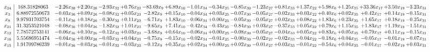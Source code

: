 \documentclass[9pt]{article}
\begin{document}
 \[\begin{array}{c| c c@{\hskip 2pt} c@{\hskip 2pt} c@{\hskip 2pt} c@{\hskip 2pt} c@{\hskip 2pt} c@{\hskip 2pt} c@{\hskip 2pt} c@{\hskip 2pt} c@{\hskip 2pt} c@{\hskip 2pt} c@{\hskip 2pt} c@{\hskip 2pt} c@{\hskip 2pt} c@{\hskip 2pt} c@{\hskip 2pt} c@{\hskip 2pt} c@{\hskip 2pt} }
 x_{24}   &  168.31828063 & -2.26 x_{36} & +  2.20 x_{26} & -2.93 x_{32} & +  0.76 x_{23} & -83.69 x_{9} & +  6.89 x_{10} & -1.01 x_{34} & -0.34 x_{25} & -0.85 x_{30} & -1.23 x_{27} & +  0.81 x_{33} & +  1.37 x_{22} & +  5.98 x_{6} & +  1.25 x_{35} & + 33.36 x_{17} & +  3.50 x_{19} & -3.23 x_{31}\\
 x_{3}   &  6.88972550673 & -0.03 x_{36} & +  0.09 x_{26} & -0.08 x_{32} & +  0.05 x_{23} & -2.82 x_{9} & +  0.15 x_{10} & -0.04 x_{34} & +  0.03 x_{25} & -0.07 x_{30} & -0.05 x_{27} & -0.02 x_{33} & +  0.03 x_{22} & +  0.40 x_{6} & +  0.02 x_{35} & +  0.42 x_{17} & +  0.14 x_{19} & -0.15 x_{31}\\
 x_{8}   &  9.97931703754 & -0.11 x_{36} & +  0.18 x_{26} & -0.30 x_{32} & +  0.11 x_{23} & -6.71 x_{9} & +  1.83 x_{10} & -0.06 x_{34} & +  0.00 x_{25} & -0.05 x_{30} & -0.05 x_{27} & +  0.02 x_{33} & +  0.08 x_{22} & +  1.83 x_{6} & +  0.23 x_{35} & +  1.65 x_{17} & +  0.18 x_{19} & -0.25 x_{31}\\
 x_{21}   &  31.3253521048 & -0.08 x_{36} & +  0.04 x_{26} & -1.82 x_{32} & +  1.01 x_{23} & -9.65 x_{9} & +  7.41 x_{10} & -0.42 x_{34} & -0.43 x_{25} & -0.84 x_{30} & +  0.03 x_{27} & -0.37 x_{33} & +  0.05 x_{22} & +  0.79 x_{6} & +  1.15 x_{35} & +  1.83 x_{17} & +  1.19 x_{19} & -1.51 x_{31}\\
 x_{12}   &  7.78572753141 & -0.06 x_{36} & +  0.10 x_{26} & -0.12 x_{32} & +  0.03 x_{23} & -3.68 x_{9} & +  0.64 x_{10} & -0.06 x_{34} & +  0.00 x_{25} & -0.08 x_{30} & -0.05 x_{27} & -0.04 x_{33} & +  0.05 x_{22} & +  0.83 x_{6} & +  0.05 x_{35} & +  0.79 x_{17} & +  0.11 x_{19} & -0.15 x_{31}\\
 x_{16}   &  5.55686951474 & -0.04 x_{36} & +  0.00 x_{26} & -0.03 x_{32} & +  0.04 x_{23} & -0.75 x_{9} & -0.15 x_{10} & -0.02 x_{34} & -0.01 x_{25} & -0.00 x_{30} & -0.02 x_{27} & -0.02 x_{33} & -0.04 x_{22} & -0.18 x_{6} & +  0.04 x_{35} & -0.05 x_{17} & -0.01 x_{19} & -0.07 x_{31}\\
 x_{15}   &  1.91709786239 & -0.01 x_{36} & -0.03 x_{26} & -0.01 x_{32} & -0.03 x_{23} & -0.12 x_{9} & +  0.35 x_{10} & +  0.02 x_{34} & +  0.00 x_{25} & +  0.02 x_{30} & -0.01 x_{27} & +  0.03 x_{33} & -0.01 x_{22} & -0.54 x_{6} & +  0.04 x_{35} & -0.01 x_{17} & -0.02 x_{19} & +  0.03 x_{31}\\

\end{array}\]
\end{document}
